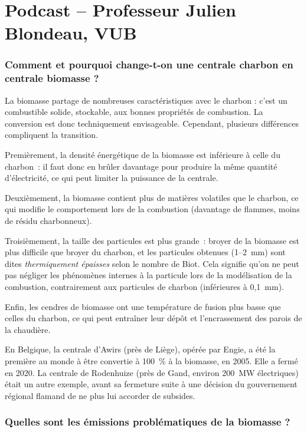 \section{Podcast -- Professeur Julien Blondeau, VUB}

\subsubsection{Comment et pourquoi change-t-on une centrale charbon en centrale biomasse ?}

La biomasse partage de nombreuses caractéristiques avec le charbon : c'est un combustible solide, stockable, aux bonnes propriétés de combustion. La conversion est donc techniquement envisageable. Cependant, plusieurs différences compliquent la transition.

Premièrement, la densité énergétique de la biomasse est inférieure à celle du charbon~: il faut donc en brûler davantage pour produire la même quantité d'électricité, ce qui peut limiter la puissance de la centrale.

Deuxièmement, la biomasse contient plus de matières volatiles que le charbon, ce qui modifie le comportement lors de la combustion (davantage de flammes, moins de résidu charbonneux).

Troisièmement, la taille des particules est plus grande~: broyer de la biomasse est plus difficile que broyer du charbon, et les particules obtenues (1--2~mm) sont dites \textit{thermiquement épaisses} selon le nombre de Biot. Cela signifie qu'on ne peut pas négliger les phénomènes internes à la particule lors de la modélisation de la combustion, contrairement aux particules de charbon (inférieures à 0,1~mm).

Enfin, les cendres de biomasse ont une température de fusion plus basse que celles du charbon, ce qui peut entraîner leur dépôt et l'encrassement des parois de la chaudière.

En Belgique, la centrale d'Awirs (près de Liège), opérée par Engie, a été la première au monde à être convertie à 100~\% à la biomasse, en 2005. Elle a fermé en 2020. La centrale de Rodenhuize (près de Gand, environ 200~MW électriques) était un autre exemple, avant sa fermeture suite à une décision du gouvernement régional flamand de ne plus lui accorder de subsides.

\subsubsection{Quelles sont les émissions problématiques de la biomasse ?}

